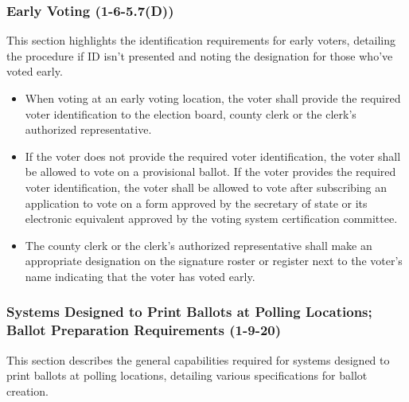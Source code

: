 \documentclass{article}
\begin{document}
\subsubsection{Early Voting (1-6-5.7(D))}
This section highlights the identification requirements for early voters, detailing the procedure if ID isn't presented and noting the designation for those who've voted early.

\begin{itemize}
    \item When voting at an early voting location, the voter shall provide the required voter identification to the election board, county clerk or the clerk's authorized representative.
    \item If the voter does not provide the required voter identification, the voter shall be allowed to vote on a provisional ballot. If the voter provides the required voter identification, the voter shall be allowed to vote after subscribing an application to vote on a form approved by the secretary of state or its electronic equivalent approved by the voting system certification committee.
    \item The county clerk or the clerk's authorized representative shall make an appropriate designation on the signature roster or register next to the voter's name indicating that the voter has voted early.
\end{itemize}

\subsubsection{Systems Designed to Print Ballots at Polling Locations; Ballot Preparation Requirements (1-9-20)}
This section describes the general capabilities required for systems designed to print ballots at polling locations, detailing various specifications for ballot creation.
\end{document}
